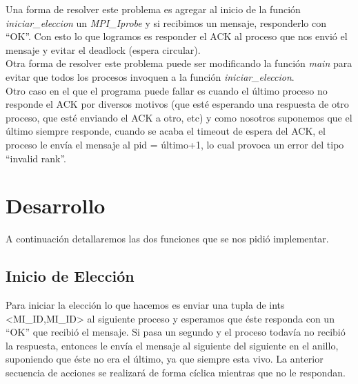 \documentclass[hidelinks,a4paper,12pt, nofootinbib]{article}
\begin{document}
Una forma de resolver este problema es agregar al inicio de la función \textit{iniciar\_eleccion} un \textit{MPI\_Iprobe} y si recibimos un mensaje, responderlo con ``OK''. Con esto lo que logramos es responder el ACK al proceso que nos envió el mensaje y evitar el deadlock (espera circular). \\

Otra forma de resolver este problema puede ser modificando la función \textit{main} para evitar que todos los procesos invoquen a la función \textit{iniciar\_eleccion}. \\

Otro caso en el que el programa puede fallar es cuando el último proceso no responde el ACK por diversos motivos (que esté esperando una respuesta de otro proceso, que esté enviando el ACK a otro, etc) y como nosotros suponemos que el último siempre responde, cuando se acaba el timeout de espera del ACK, el proceso le envía el mensaje al pid = último+1, lo cual provoca un error del tipo ``invalid rank''.

\section{Desarrollo}
A continuación detallaremos las dos funciones que se nos pidió implementar.
\subsection{Inicio de Elección}
Para iniciar la elección lo que hacemos es enviar una tupla de ints <MI\_ID,MI\_ID> al siguiente proceso y esperamos que éste responda con un ``OK'' que recibió el mensaje. Si pasa un segundo y el proceso todavía no recibió la respuesta, entonces le envía el mensaje al siguiente del siguiente en el anillo, suponiendo que éste no era el último, ya que siempre esta vivo. La anterior secuencia de acciones se realizará de forma cíclica mientras que no le respondan.
\end{document}
